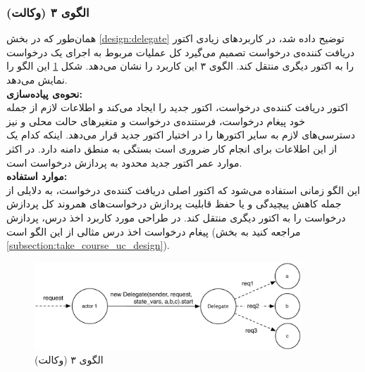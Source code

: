 \subsubsection{الگوی ۳ (وکالت)}
\label{pattern:delegate}
همان‌طور که در بخش \ref{design:delegate} توضیح داده شد، در کاربردهای زیادی اکتور دریافت کننده‌ی درخواست تصمیم می‌گیرد کل عملیات مربوط به اجرای یک درخواست را به اکتور دیگری منتقل کند. الگوی ۳ این کاربرد را نشان می‌دهد. شکل \ref{fig:Patterns_stateless_delegate} این الگو را نمایش می‌دهد.\\
\textbf{نحوه‌ی پیاده‌سازی:}\\
 اکتور دریافت کننده‌ی درخواست، اکتور جدید را ایجاد می‌کند و اطلاعات لازم از جمله خود پیغام درخواست، فرستنده‌ی درخواست و متغیرهای حالت محلی و نیز دسترسی‌های لازم به سایر اکتورها را در اختیار اکتور جدید قرار می‌دهد. اینکه کدام یک از  این اطلاعات برای انجام کار ضروری است بستگی به منطق دامنه دارد. در اکثر موارد عمر اکتور جدید محدود به پردازش درخواست است.\\
 \textbf{موارد استفاده:}\\
این الگو زمانی استفاده می‌شود که اکتور اصلی دریافت کننده‌ی درخواست، به دلایلی از جمله کاهش پیچیدگی و یا حفظ قابلیت پردازش درخواست‌های همروند کل پردازش درخواست را به اکتور دیگری منتقل کند. در طراحی مورد کاربرد اخذ درس، پردازش پیغام درخواست اخذ درس مثالی از این الگو است (مراجعه کنید به بخش \ref{subsection:take_course_uc_design}).
\begin{figure}[hb]
    \begin{center}
	\includegraphics[width=10cm]{4-ProposedFramework/Figures/Patterns_stateless_Delegate.pdf}
    \end{center}
    \caption{\label{fig:Patterns_stateless_delegate}الگوی ۳ (وکالت)}
\end{figure}

